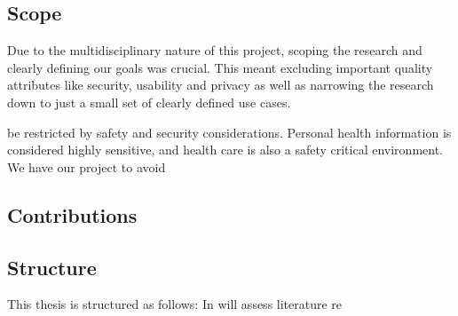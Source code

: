 \subsection{Scope} 

\label{sub:scope}

Due to the multidisciplinary nature of this project, scoping the research and clearly defining our goals was crucial. This meant excluding important quality attributes like security, usability and privacy as well as narrowing the research down to just a small set of clearly defined use cases.

be restricted by safety and security considerations. Personal health information is considered highly sensitive, and health care is also a safety critical environment. We have our project to avoid 

\subsection{Contributions} 

\label{sub:contributions}

\subsection{Structure} 

This thesis is structured as follows: In will assess literature re

\label{sub:structure}

